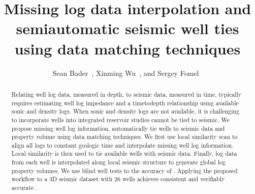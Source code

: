 \title{Missing log data interpolation and semiautomatic seismic well ties using data matching techniques}
\author{Sean Bader~\footnotemark[1], Xinming Wu~\footnotemark[1], and Sergey Fomel~\footnotemark[1]}
\maketitle
\address{
Bureau of Economic Geology \\
John A. and Katherine G. Jackson School of Geosciences \\
The University of Texas at Austin \\
University Station, Box X \\
Austin, TX 78713-8924 \\
}


\begin{abstract}
Relating well log data, measured in depth, to seismic data, measured in time, typically requires estimating well log impedance and a time\new{-}to\new{-}depth relationship using available sonic and density logs. When sonic and density logs are not available, it is challenging to incorporate wells into integrated reservoir studies  cannot be tied to seismic. We propose  missing well log information, automatically tie wells to seismic data and  property volume using data matching techniques. We first use local similarity scan to align all logs to constant geologic time and interpolate missing well log information. Local similarity is then used to tie available wells with seismic data. Finally, log data from each well is interpolated along  local seismic structure to generate global log property volumes. We use blind well tests to  the accuracy of . Applying the proposed workflow to a 3D seismic dataset with 26 wells achieves consistent and verifiably accurate .
\end{abstract}

